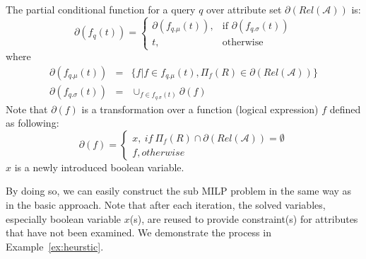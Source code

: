 \begin{definition} 
	The partial conditional function for a query $q$ over 
	attribute set $\partial(Rel\mathcal{(A)})$ is:
	\[
    \partial (f_q(t))= 
\begin{cases}
    \partial (f_{q.\mu} (t)) ,& \text{if } \partial (f_{q.\sigma} (t))\\
    t,              & \text{otherwise}
\end{cases}
\]
where
\begin{eqnarray*}
\partial (f_{q.\mu} (t)) &=& \{f|f\in f_{q.\mu}(t), \Pi_{f}(R) 
\in \partial (Rel\mathcal{(A)})\}\\
\partial (f_{q.\sigma} (t)) &=& \cup_{f \in f_{q.\sigma} (t)} \partial(f)
\end{eqnarray*}
Note that $\partial(f)$ is a transformation over a function 
(logical expression) $f$ defined
as following:
\[
\partial(f) = 
\begin{cases}
x,\ if\ \Pi_{f}(R) \cap \partial(Rel\mathcal{(A)}) = \emptyset\\
f, otherwise
\end{cases}
\]
$x$ is a newly introduced boolean variable. 
\end{definition} 
By doing so, we can easily construct the sub MILP problem 
in the same way as in the basic approach. Note that 
after each iteration, the solved variables, 
especially boolean variable $x$(s), are reused to provide 
constraint(s) for attributes that have not been examined. 
We demonstrate the process in Example~\ref{ex:heurstic}.

